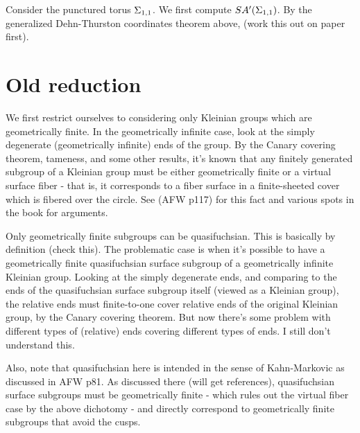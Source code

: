 {\begin{example}
\end{example}

\begin{example}

Consider the punctured torus $\Sigma_{1,1}$. We first compute $SA'(\Sigma_{1,1})$.
By the generalized Dehn-Thurston coordinates theorem above, (work this out on
paper first).

\end{example}

\section{Old reduction}

We first restrict ourselves to considering only Kleinian groups which are
geometrically finite. In the geometrically infinite case, look at the simply
degenerate (geometrically infinite) ends of the group. By the Canary covering
theorem, tameness, and some other results, it's known that any finitely
generated subgroup of a Kleinian group must be either geometrically finite or
a virtual surface fiber - that is, it corresponds to a fiber surface in
a finite-sheeted cover which is fibered over the circle. See (AFW p117) for
this fact and various spots in the book for arguments.


Only geometrically finite subgroups can be quasifuchsian. This is basically by
definition (check this). The problematic case is when it's possible to have
a geometrically finite quasifuchsian surface subgroup of a geometrically
infinite Kleinian group. Looking at the simply degenerate ends, and comparing
to the ends of the quasifuchsian surface subgroup itself (viewed as a Kleinian
group), the relative ends must finite-to-one cover relative ends of the
original Kleinian group, by the Canary covering theorem. But now there's some
problem with different types of (relative) ends covering different types of
ends. I still don't understand this.

Also, note that quasifuchsian here is intended in the sense of Kahn-Markovic as
discussed in AFW p81. As discussed there (will get references), quasifuchsian
surface subgroups must be geometrically finite - which rules out the virtual
fiber case by the above dichotomy - and directly correspond to geometrically
finite subgroups that avoid the cusps.

}
